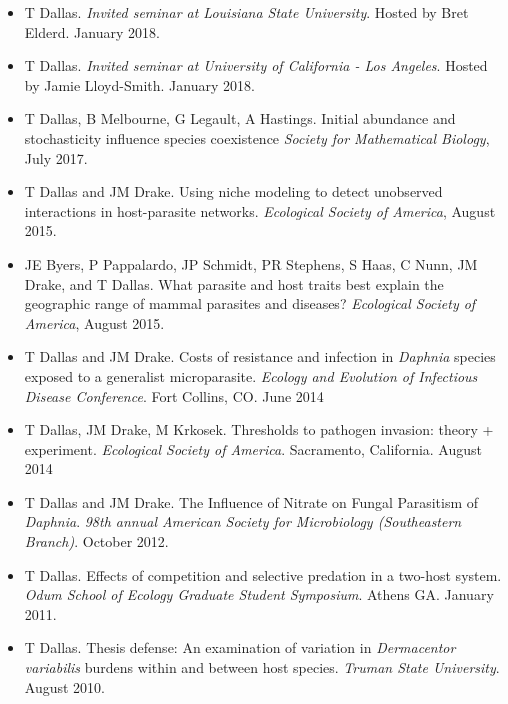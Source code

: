 \documentclass[]{CV}
\begin{document}
\begin{itemize}
\item {\mefont T Dallas}. \textit{Invited seminar at Louisiana State University}. Hosted by Bret Elderd. January 2018. 

\item {\mefont T Dallas}. \textit{Invited seminar at University of California - Los Angeles}. Hosted by Jamie Lloyd-Smith. January 2018. 

\item {\mefont T Dallas}, B Melbourne, G Legault, A Hastings. Initial abundance and stochasticity influence species coexistence \textit{Society for Mathematical Biology}, July 2017.

\item {\mefont T Dallas} and JM Drake. Using niche modeling to detect unobserved interactions in host-parasite networks. \textit{Ecological Society of America}, August 2015.

\item JE Byers, P Pappalardo, JP Schmidt, PR Stephens, S Haas, C Nunn, JM Drake, and {\mefont T Dallas}. What parasite and host traits best explain the geographic range of mammal parasites and diseases? \textit{Ecological Society of America}, August  2015.

\item {\mefont T Dallas} and JM Drake. Costs of resistance and infection in \textit{Daphnia} species exposed to a generalist microparasite. \textit{Ecology and Evolution of Infectious Disease Conference}. Fort Collins, CO. June 2014

\item  {\mefont T Dallas}, JM Drake, M Krkosek. Thresholds to pathogen invasion: theory + experiment. \textit{Ecological Society of America}. Sacramento, California. August 2014

\item {\mefont T Dallas} and JM Drake. The Influence of Nitrate on Fungal Parasitism of \textit{Daphnia}. \textit{98th annual American Society for Microbiology (Southeastern Branch)}. October 2012.

\item {\mefont T Dallas}. Effects of competition and selective predation in a two-host system. \textit{Odum School of Ecology Graduate Student Symposium}. Athens GA. January 2011.

\item {\mefont T Dallas}. Thesis defense: An examination of variation in \textit{Dermacentor variabilis} burdens within and between host species. \textit{Truman State University}. August 2010.

\end{itemize}
\end{document}
